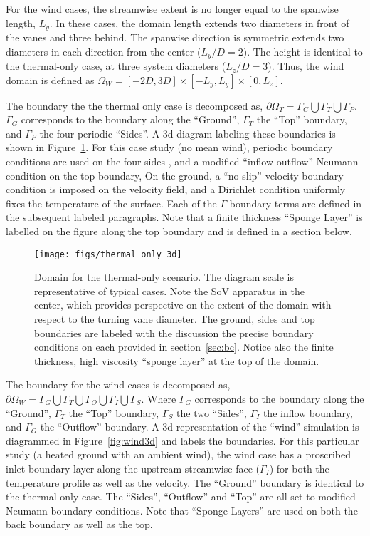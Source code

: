 For the wind cases, the streamwise extent is no longer equal to
the spanwise length, $L_y$. In these cases, the domain length extends
two diameters in front of the vanes and three behind. The
spanwise direction is symmetric extends two diameters in each direction 
from the center ($L_y/D = 2$). The height is identical to the
thermal-only case, at three system diameters ($L_z/D = 3$). Thus, the
wind domain is defined as $\Omega_W = \left[-2D,3D \right] \times
\left[-L_y,L_y \right] \times \left[0,L_z \right]$.   

The boundary the the thermal only case is decomposed as,
$\partial \Omega_T = \Gamma_G \bigcup \Gamma_T \bigcup \Gamma_P $. 
$\Gamma_G$ corresponds to the boundary along the ``Ground'', $\Gamma_T$
the ``Top'' boundary, and $\Gamma_P$ the four periodic ``Sides''. A 3d
diagram labeling these boundaries is shown in
Figure~\ref{fig:thermal3d}. For this case study (no mean wind),
periodic boundary conditions are used on the four sides , and a modified 
``inflow-outflow'' Neumann condition\cite{gunzburger1989finite} on the
top boundary, On the ground, a ``no-slip'' velocity boundary condition is
imposed on the velocity field, and a Dirichlet condition uniformly fixes
the temperature of the surface. 
Each of the $\Gamma$ boundary terms are defined in the subsequent
labeled paragraphs. Note that a finite thickness ``Sponge Layer'' is
labelled on the figure along the top boundary and is defined in a
section below. 

\begin{figure}[!htb]
  \begin{center}
    \texttt{[image: figs/thermal\_only\_3d]}
    \caption{Domain for the thermal-only
   scenario. The diagram scale is representative of typical cases. Note
   the SoV apparatus in the center, which provides perspective on the
   extent of the domain with respect to the turning vane diameter. The
   ground, sides and top boundaries are labeled with the discussion the
   precise boundary conditions on each provided in
   section~\ref{sec:bc}. Notice also the finite thickness, high
   viscosity ``sponge layer'' at the top of the domain.} 
    \label{fig:thermal3d}
  \end{center}
\end{figure}

The boundary for the wind cases is decomposed as,
$\partial \Omega_W = \Gamma_G \bigcup \Gamma_T \bigcup \Gamma_O \bigcup
\Gamma_I \bigcup \Gamma_S $.  
Where $\Gamma_G$ corresponds to the boundary along the ``Ground'',
$\Gamma_T$ the ``Top'' boundary, $\Gamma_S$ the two ``Sides'',
$\Gamma_I$ the inflow boundary, and $\Gamma_O$ the ``Outflow''  
boundary.
A 3d representation of the ``wind'' simulation is diagrammed in
Figure~\ref{fig:wind3d} and labels the boundaries. 
For this particular study (a heated ground with 
an ambient wind), the wind case has a proscribed inlet boundary layer
along the upstream streamwise face ($\Gamma_I$) for both the temperature
profile as well as the velocity. The ``Ground'' boundary is identical to
the thermal-only case. The ``Sides'', ``Outflow'' and ``Top'' are all
set to modified Neumann boundary conditions. Note that ``Sponge Layers''
are used on both the back boundary as well as the top. 

